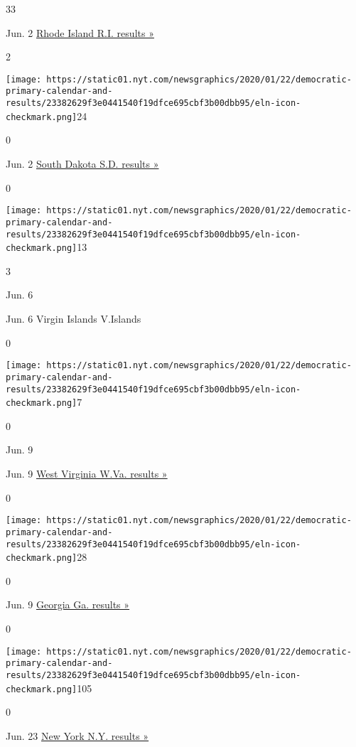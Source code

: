 33

Jun. 2
\href{https://www.nytimes.com/interactive/2020/06/02/us/elections/results-rhode-island-president-democrat-primary-election.html}{Rhode
Island R.I. results »}

2

\texttt{[image: https://static01.nyt.com/newsgraphics/2020/01/22/democratic-primary-calendar-and-results/23382629f3e0441540f19dfce695cbf3b00dbb95/eln-icon-checkmark.png]}24

0

Jun. 2
\href{https://www.nytimes.com/interactive/2020/06/02/us/elections/results-south-dakota-primary-elections.html}{South
Dakota S.D. results »}

0

\texttt{[image: https://static01.nyt.com/newsgraphics/2020/01/22/democratic-primary-calendar-and-results/23382629f3e0441540f19dfce695cbf3b00dbb95/eln-icon-checkmark.png]}13

3

Jun. 6

Jun. 6 Virgin Islands V.Islands

0

\texttt{[image: https://static01.nyt.com/newsgraphics/2020/01/22/democratic-primary-calendar-and-results/23382629f3e0441540f19dfce695cbf3b00dbb95/eln-icon-checkmark.png]}7

0

Jun. 9

Jun. 9
\href{https://www.nytimes.com/interactive/2020/06/09/us/elections/results-west-virginia-primary-elections.html}{West
Virginia W.Va. results »}

0

\texttt{[image: https://static01.nyt.com/newsgraphics/2020/01/22/democratic-primary-calendar-and-results/23382629f3e0441540f19dfce695cbf3b00dbb95/eln-icon-checkmark.png]}28

0

Jun. 9
\href{https://www.nytimes.com/interactive/2020/06/09/us/elections/results-georgia-primary-elections.html}{Georgia
Ga. results »}

0

\texttt{[image: https://static01.nyt.com/newsgraphics/2020/01/22/democratic-primary-calendar-and-results/23382629f3e0441540f19dfce695cbf3b00dbb95/eln-icon-checkmark.png]}105

0

Jun. 23
\href{https://www.nytimes.com/interactive/2020/06/23/us/elections/results-new-york-primary-elections.html}{New
York N.Y. results »}

